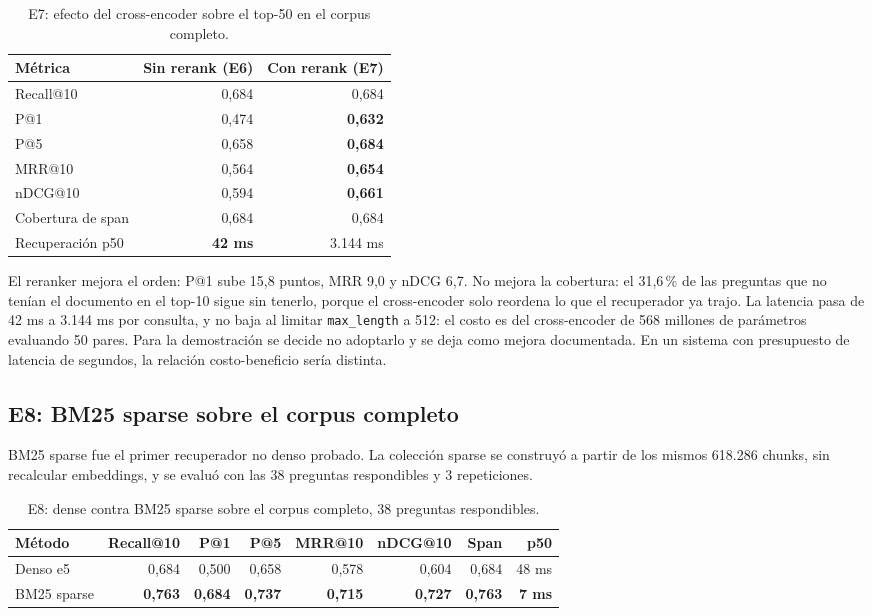 \documentclass[11pt]{tg_usta}
\begin{document}
\begin{table}[htbp]
\centering
\footnotesize
\begin{tabular}{@{}lrr}
\toprule
Métrica & Sin rerank (E6) & Con rerank (E7) \\
\midrule
Recall@10 & 0,684 & 0,684 \\
P@1 & 0,474 & \textbf{0,632} \\
P@5 & 0,658 & \textbf{0,684} \\
MRR@10 & 0,564 & \textbf{0,654} \\
nDCG@10 & 0,594 & \textbf{0,661} \\
Cobertura de span & 0,684 & 0,684 \\
Recuperación p50 & \textbf{42 ms} & 3.144 ms \\
\bottomrule
\end{tabular}
\caption{E7: efecto del cross-encoder sobre el top-50 en el corpus completo.}
\label{tab:e7}
\end{table}

El reranker mejora el orden: P@1 sube 15,8 puntos, MRR 9,0 y nDCG 6,7. No mejora la cobertura: el 31,6\,\% de las preguntas que no tenían el documento en el top-10 sigue sin tenerlo, porque el cross-encoder solo reordena lo que el recuperador ya trajo. La latencia pasa de 42 ms a 3.144 ms por consulta, y no baja al limitar \texttt{max\_length} a 512: el costo es del cross-encoder de 568 millones de parámetros evaluando 50 pares. Para la demostración se decide no adoptarlo y se deja como mejora documentada. En un sistema con presupuesto de latencia de segundos, la relación costo-beneficio sería distinta.

\subsection{E8: BM25 sparse sobre el corpus completo}
\label{sec:sparse}

BM25 sparse fue el primer recuperador no denso probado. La colección sparse se construyó a partir de los mismos 618.286 chunks, sin recalcular embeddings, y se evaluó con las 38 preguntas respondibles y 3 repeticiones.

\begin{table}[htbp]
\centering
\footnotesize
\begin{tabular}{@{}lrrrrrrr@{}}
\toprule
Método & Recall@10 & P@1 & P@5 & MRR@10 & nDCG@10 & Span & p50 \\
\midrule
Denso e5 & 0,684 & 0,500 & 0,658 & 0,578 & 0,604 & 0,684 & 48 ms \\
BM25 sparse & \textbf{0,763} & \textbf{0,684} & \textbf{0,737} & \textbf{0,715} & \textbf{0,727} & \textbf{0,763} & \textbf{7 ms} \\
\bottomrule
\end{tabular}
\caption{E8: dense contra BM25 sparse sobre el corpus completo, 38 preguntas respondibles.}
\label{tab:e8}
\end{table}
\end{document}
